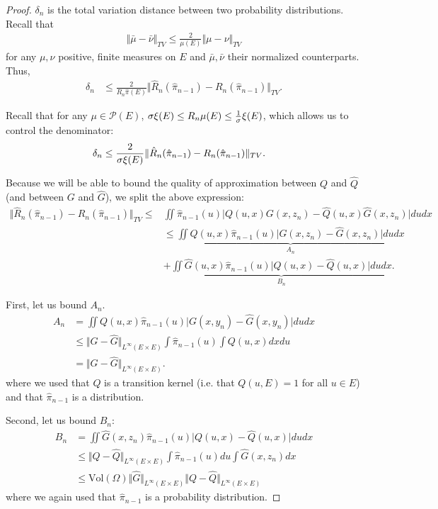 \begin{proof}
$\delta_n$ is the total variation distance between two probability distributions. Recall that
\begin{align}
    \Vert \bar \mu - \bar \nu\Vert_{TV} \leq \frac{2}{\mu(E)}\Vert \mu - \nu\Vert_{TV}
\end{align}
for any $\mu, \nu$ positive, finite measures on $E$ and $\bar \mu, \bar \nu$ their normalized counterparts.
Thus,
\begin{align}
    \delta_n & \leq \frac{2}{R_n\hat\pi(E)}\Vert\hat R_n(\hat\pi_{n-1}) - R_n(\hat\pi_{n-1})\Vert_{TV}.
\end{align}

Recall that for any $\mu\in\mathcal P(E)$, $\sigma\xi(E) \leq R_n\mu(E)\leq \frac{1}{\sigma}\xi(E)$, which allows us to control the denominator:
\begin{align}
    \delta_n & \leq \frac{2}{\sigma\xi(E)}\Vert\hat R_n(\hat\pi_{n-1}) - R_n(\hat\pi_{n-1})\Vert_{TV}.
\end{align}

Because we will be able to bound the quality of approximation between $Q$ and $\hat Q$ (and between $G$ and $\hat G$), we split the above expression:
\begin{align}
\Vert\hat R_n(\hat\pi_{n-1}) - R_n(\hat\pi_{n-1})\Vert_{TV} \leq& \iint \hat \pi_{n-1}(u)\vert Q(u, x)G(x, z_n) - \hat Q(u, x)\hat G(x, z_n)\vert dudx\\
& \leq \underbrace{\iint Q(u, x) \hat \pi_{n-1}(u)\vert G(x, z_n) - \hat G(x, z_n)\vert dudx}_{A_n}\label{eq:delta-a} \\
& + \underbrace{\iint \hat G(u, x) \hat \pi_{n-1}(u)\vert Q(u, x) - \hat Q(u, x)\vert dudx}_{B_n}.\label{eq:delta-b}
\end{align}

First, let us bound $A_n$.
\begin{align}
A_n &= \iint Q(u, x) \hat \pi_{n-1}(u)\vert G(x, y_n) - \hat G(x, y_n)\vert dudx\\
&\leq \Vert G-\hat G\Vert_{L^\infty(E\times E)}\int \hat\pi_{n-1}(u)\int Q(u,x)dxdu\\
&= \Vert G-\hat G\Vert_{L^\infty(E\times E)}.
\end{align}
where we used that $Q$ is a transition kernel (i.e. that $Q(u, E)=1$ for all $u\in E$) and that $\hat\pi_{n-1}$ is a distribution.

Second, let us bound $B_n$:
\begin{align}
B_n &= \iint \hat G(x, z_n) \hat \pi_{n-1}(u)\vert Q(u, x) - \hat Q(u, x)\vert dudx\\
    &\leq \Vert Q-\hat Q\Vert_{L^\infty(E\times E)}\int \hat \pi_{n-1}(u)du \int \hat G(x, z_n)dx\\
    &\leq \textrm{Vol}(\Omega)\Vert \hat G\Vert_{L^\infty(E\times E)}\Vert Q-\hat Q\Vert_{L^\infty(E\times E)}
\end{align}
where we again used that $\hat \pi_{n-1}$ is a probability distribution.
\end{proof}

